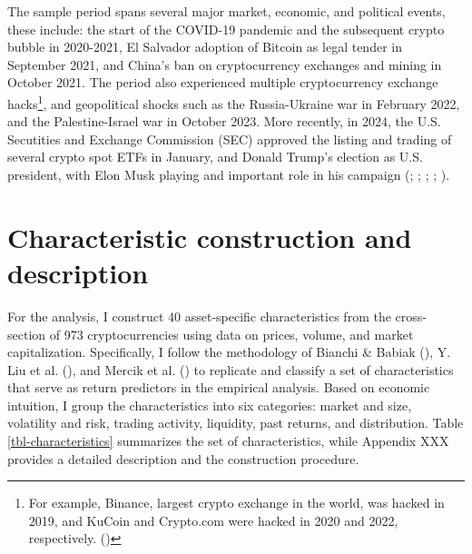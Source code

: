 \documentclass[
  12pt,
  a4paper,
  openany]{scrbook}
\begin{document}
The sample period spans several major market, economic, and political
events, these include: the start of the COVID-19 pandemic and the
subsequent crypto bubble in 2020-2021, El Salvador adoption of Bitcoin
as legal tender in September 2021, and China's ban on cryptocurrency
exchanges and mining in October 2021. The period also experienced
multiple cryptocurrency exchange hacks\footnote{For example, Binance,
  largest crypto exchange in the world, was hacked in 2019, and KuCoin
  and Crypto.com were hacked in 2020 and 2022, respectively.
  ()}, and
geopolitical shocks such as the Russia-Ukraine war in February 2022, and
the Palestine-Israel war in October 2023. More recently, in 2024, the
U.S. Secutities and Exchange Commission (SEC) approved the listing and
trading of several crypto spot ETFs in January, and Donald Trump's
election as U.S. president, with Elon Musk playing and important role in
his campaign
(; ;
;
; ).

\section{Characteristic construction and
description}\label{sec-characteristics}

For the analysis, I construct 40 asset-specific characteristics from the
cross-section of 973 cryptocurrencies using data on prices, volume, and
market capitalization. Specifically, I follow the methodology of Bianchi
\& Babiak (),
Y. Liu et al. (), and Mercik et
al.
()
to replicate and classify a set of characteristics that serve as return
predictors in the empirical analysis. Based on economic intuition, I
group the characteristics into six categories: market and size,
volatility and risk, trading activity, liquidity, past returns, and
distribution. Table \ref{tbl-characteristics} summarizes the set of
characteristics, while Appendix XXX provides a detailed description and
the construction procedure.
\end{document}
